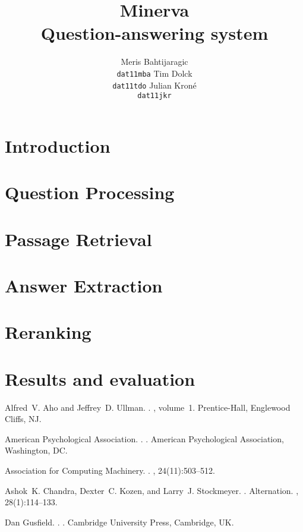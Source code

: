 \documentclass[11pt,letterpaper]{article}
\title{Minerva \\ Question-answering system}
\author{Meris Bahtijaragic\\
	    {\tt dat11mba}
	    \And
	    Tim Dolck\\
      {\tt dat11tdo}
      \And
      Julian Kron\'{e}\\
      {\tt dat11jkr}
}
\date{}
\begin{document}
\maketitle
\begin{abstract}

\end{abstract}
\section{Introduction}

\section{Question Processing}

\section{Passage Retrieval}

\section{Answer Extraction}

\section{Reranking}

\section{Results and evaluation}


\begin{thebibliography}{}

Alfred~V. Aho and Jeffrey~D. Ullman.
.
, volume~1.
\newblock Prentice-{Hall}, Englewood Cliffs, NJ.

{American Psychological Association}.
.
.
\newblock American Psychological Association, Washington, DC.

{Association for Computing Machinery}.
.
, 24(11):503--512.

Ashok~K. Chandra, Dexter~C. Kozen, and Larry~J. Stockmeyer.
.
\newblock Alternation.
,
  28(1):114--133.

Dan Gusfield.
.
.
\newblock Cambridge University Press, Cambridge, UK.

\end{thebibliography}
\end{document}
